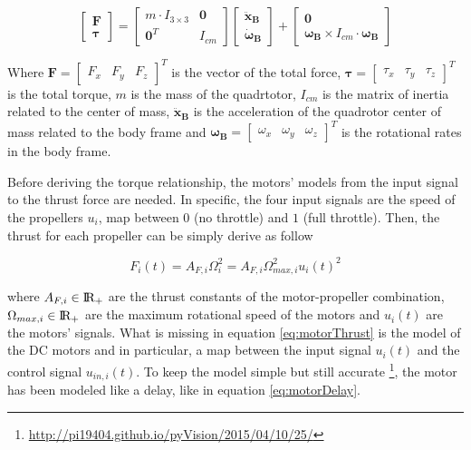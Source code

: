 \begin{equation}
	\begin{bmatrix}
		\mathbf{F} \\
		\boldsymbol{\tau}
	\end{bmatrix}
	=
	\begin{bmatrix}
		m \cdot I_{3\times 3} & \mathbf{0} \\
		\mathbf{0}^T & I_{cm}
	\end{bmatrix}
	\begin{bmatrix}
		\mathbf{\ddot{x}_B} \\
		\boldsymbol{\dot{\omega}_B}
	\end{bmatrix}
	+
	\begin{bmatrix}
		\mathbf{0} \\
		\boldsymbol{\omega_B} \times I_{cm} \cdot \boldsymbol{\omega_B}
	\end{bmatrix}
	\label{eq:NewtonEuler}
\end{equation}

\noindent Where $\mathbf{F} = \begin{bmatrix} F_x & F_y & F_z \end{bmatrix}^T$ is the vector of the total force, $\boldsymbol{\tau} = \begin{bmatrix} \tau_x & \tau_y & \tau_z \end{bmatrix}^T$ is the total torque, $m$ is the mass of the quadrtotor, $I_{cm}$ is the matrix of inertia related to the center of mass, $\mathbf{\ddot{x}_B}$ is the acceleration of the quadrotor center of mass related to the body frame and $\boldsymbol{\omega_B} = \begin{bmatrix} \omega_x & \omega_y & \omega_z \end{bmatrix}^T$ is the rotational rates in the body frame.

\noindent Before deriving the torque relationship, the motors' models from the input signal to the thrust force are needed. In specific, the four input signals are the speed of the propellers $u_i$, map between $0$ (no throttle) and $1$ (full throttle). Then, the thrust for each propeller can be simply derive as follow

\begin{equation}
	F_i(t) = A_{F,i} \Omega_i^2 = A_{F,i}\Omega_{max, i}^2 u_i(t)^2
	\label{eq:motorThrust}
\end{equation}

\noindent where $A_{F,i} \in \rm I\!R_+$ are the thrust constants of the motor-propeller combination, $\Omega_{max, i} \in \rm I\!R_+$ are the maximum rotational speed of the motors and $u_i(t)$ are the motors' signals. What is missing in equation \eqref{eq:motorThrust} is the model of the DC motors and in particular, a map between the input signal $u_i(t)$ and the control signal $u_{in,i}(t)$. To keep the model simple but still accurate \footnote{\url{http://pi19404.github.io/pyVision/2015/04/10/25/}}, the motor has been modeled like a delay, like in equation \eqref{eq:motorDelay}.

